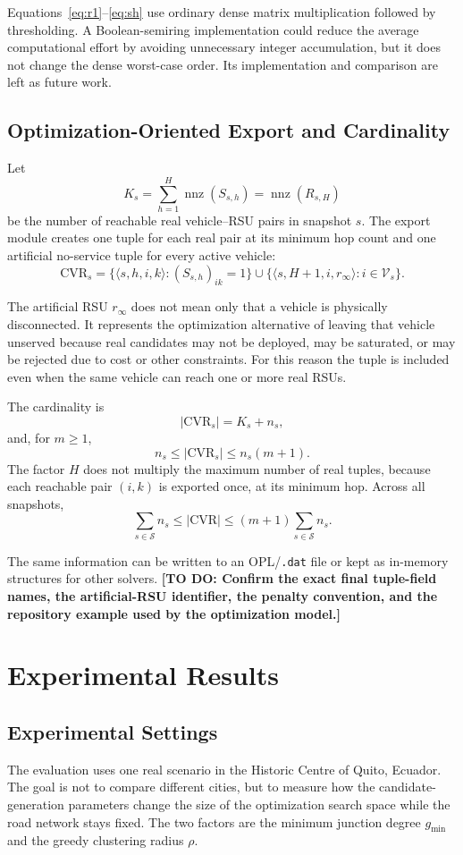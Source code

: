 \documentclass[engproc,proceedingpaper,submit,oneauthor]{Definitions/mdpi}
\newcommand{\added}[1]{{\color{revisionblue}#1}}
\newcommand{\todo}[1]{{\color{todored}\textbf{[TO DO: #1]}}}
\newcommand{\nnz}{\operatorname{nnz}}
\newcommand{\CVR}{\mathrm{CVR}}
\begin{document}
	Equations~\eqref{eq:r1}--\eqref{eq:sh} use ordinary dense matrix multiplication
	followed by thresholding. \added{A Boolean-semiring implementation could reduce the
		average computational effort by avoiding unnecessary integer accumulation, but it does
		not change the dense worst-case order. Its implementation and comparison are left as
		future work.}
	
	\subsection{Optimization-Oriented Export and Cardinality}
	Let
	\[
	K_s=\sum_{h=1}^{H}\nnz(S_{s,h})=\nnz(R_{s,H})
	\]
	be the number of reachable real vehicle--RSU pairs in snapshot $s$. The export module
	creates one tuple for each real pair at its minimum hop count and one artificial
	no-service tuple for every active vehicle:
	\[
	\CVR_s=
	\{\langle s,h,i,k\rangle:(S_{s,h})_{ik}=1\}
	\cup
	\{\langle s,H+1,i,r_\infty\rangle:i\in\mathcal V_s\}.
	\]
	
	The artificial RSU $r_\infty$ does not mean only that a vehicle is physically
	disconnected. It represents the optimization alternative of leaving that vehicle
	unserved because real candidates may not be deployed, may be saturated, or may be
	rejected due to cost or other constraints. For this reason the tuple is included even
	when the same vehicle can reach one or more real RSUs.
	
	The cardinality is
	\[
	|\CVR_s|=K_s+n_s,
	\]
	and, for $m\ge 1$,
	\[
	n_s\le |\CVR_s|\le n_s(m+1).
	\]
	The factor $H$ does not multiply the maximum number of real tuples, because each
	reachable pair $(i,k)$ is exported once, at its minimum hop. Across all snapshots,
	\[
	\sum_{s\in\mathcal S}n_s\le |\CVR|\le(m+1)\sum_{s\in\mathcal S}n_s.
	\]
	
	The same information can be written to an OPL/\texttt{.dat} file or kept as in-memory
	structures for other solvers. \todo{Confirm the exact final tuple-field names, the
		artificial-RSU identifier, the penalty convention, and the repository example used by
		the optimization model.}
	
	\section{Experimental Results}\label{sec:results}
	
	\subsection{Experimental Settings}
	The evaluation uses one real scenario in the Historic Centre of Quito, Ecuador. The
	goal is not to compare different cities, but to measure how the candidate-generation
	parameters change the size of the optimization search space while the road network
	stays fixed. The two factors are the minimum junction degree $g_{\min}$ and the greedy
	clustering radius $\rho$.
	
\end{document}

